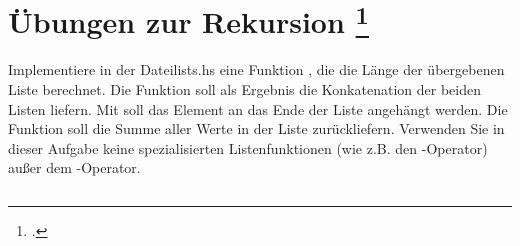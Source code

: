 \documentclass{lehramt-informatik-aufgabe}
\begin{document}
\section{Übungen zur Rekursion
\footcite{fumup:ab:3}}

Implementiere in der Dateilists.hs eine Funktion
, die die Länge der übergebenen Liste
berechnet. Die Funktion  soll
als Ergebnis die Konkatenation der beiden Listen liefern. Mit
 soll das Element an das Ende der
Liste angehängt werden. Die Funktion  soll
die Summe aller Werte in der Liste zurückliefern. Verwenden Sie in
dieser Aufgabe keine spezialisierten Listenfunktionen (wie z.B. den
\liHaskellCode{++}-Operator) außer dem \liHaskellCode{:}-Operator.

\begin{verbatim}
\end{verbatim}
\end{document}
